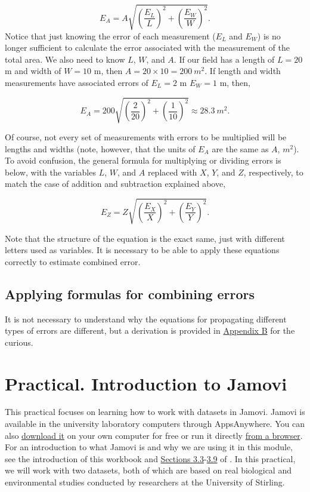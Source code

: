\documentclass[
]{scrbook}
\begin{document}
\[E_{A} = A \sqrt{\left(\frac{E_{L}}{L} \right)^{2} + \left(\frac{E_{W}}{W} \right)^{2}}.\]
Notice that just knowing the error of each measurement (\(E_{L}\) and \(E_{W}\)) is no longer sufficient to calculate the error associated with the measurement of the total area.
We also need to know \(L\), \(W\), and \(A\).
If our field has a length of \(L = 20\) m and width of \(W = 10\) m, then \(A = 20 \times 10 = 200\:m^{2}\).
If length and width measurements have associated errors of \(E_{L} = 2\) m \(E_{W} = 1\) m, then,

\[E_{A} = 200 \sqrt{\left(\frac{2}{20} \right)^{2} + \left(\frac{1}{10} \right)^{2}} \approx 28.3\:m^{2}.\]

Of course, not every set of measurements with errors to be multiplied will be lengths and widths (note, however, that the units of \(E_{A}\) are the same as \(A\), \(m^{2}\)).
To avoid confusion, the general formula for multiplying or dividing errors is below, with the variables \(L\), \(W\), and \(A\) replaced with \(X\), \(Y\), and \(Z\), respectively, to match the case of addition and subtraction explained above,

\[E_{Z} = Z \sqrt{\left(\frac{E_{X}}{X} \right)^{2} + \left(\frac{E_{Y}}{Y} \right)^{2}}.\]

Note that the structure of the equation is the exact same, just with different letters used as variables.
It is necessary to be able to apply these equations correctly to estimate combined error.

\hypertarget{applying-formulas-for-combining-errors}{%
\section{Applying formulas for combining errors}\label{applying-formulas-for-combining-errors}}

It is not necessary to understand why the equations for propagating different types of errors are different, but a derivation is provided in \protect\hyperlink{uncertainty_derivation}{Appendix B} for the curious.

\hypertarget{Chapter_8}{%
\chapter{Practical. Introduction to Jamovi}\label{Chapter_8}}

This practical focuses on learning how to work with datasets in Jamovi.
Jamovi is available in the university laboratory computers through AppsAnywhere.
You can also \href{https://www.jamovi.org/download.html}{download it} on your own computer for free or run it directly \href{https://www.jamovi.org/cloud.html}{from a browser}.
For an introduction to what Jamovi is and why we are using it in this module, see the introduction of this workbook and \href{https://davidfoxcroft.github.io/lsj-book/03-Getting-started-with-jamovi.html\#the-spreadsheet}{Sections 3.3}-\href{https://davidfoxcroft.github.io/lsj-book/03-Getting-started-with-jamovi.html\#summary}{3.9} of \citet{Navarro2022}.
In this practical, we will work with two datasets, both of which are based on real biological and environmental studies conducted by researchers at the University of Stirling.
\end{document}
